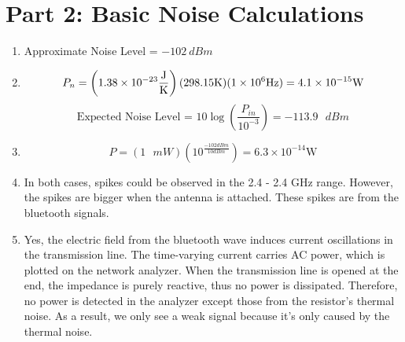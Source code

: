 \documentclass{article} %
\begin{document}
\pagebreak
\section*{Part 2: Basic Noise Calculations}
\begin{enumerate}
    \item Approximate Noise Level = $\SI{-102}{dBm}$
    \item
          $$P_n = \left(1.38 \times 10^{-23} \si{\frac{\joule}{\kelvin}}\right)(298.15 \si{\kelvin})(1 \times 10^6 \si{\hertz}) = 4.1 \times 10^{-15} \si{\watt}$$
          $$\text{Expected Noise Level = }10 \log\left(\frac{P_{in}}{10^{-3}}\right) = -113.9 \text{ } \si{ dBm}$$
    \item
          $$P = (1 \text{ }\si{mW})\left(10^\frac{-102 \si{dBm}}{10 \si{dBm}}\right) = 6.3 \times 10^{-14} \si{\watt}$$
    \item In both cases, spikes could be observed in the 2.4 - 2.4 GHz range. However, the spikes are bigger when the antenna is attached. These spikes are from the bluetooth signals.
    \item Yes, the electric field from the bluetooth wave induces current oscillations in the transmission line. The time-varying current carries AC power, which is plotted on the network analyzer. When the transmission line is opened at the end, the impedance is purely reactive, thus no power is dissipated. Therefore, no power is detected in the analyzer except those from the resistor's thermal noise. As a result, we only see a weak signal because it's only caused by the thermal noise.
\end{enumerate}
\end{document}
